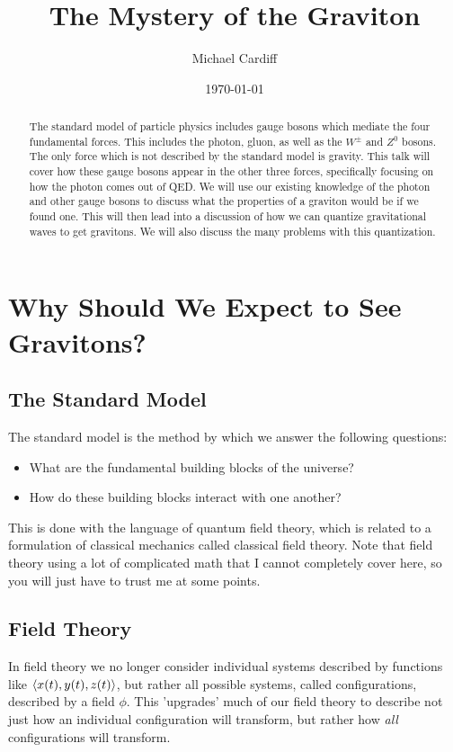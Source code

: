 \documentclass[12pt]{article}
\title{\vspace{-3em}The Mystery of the Graviton}
\author{Michael Cardiff}
\date{\today}
\begin{document}
\maketitle
\begin{abstract}
  The standard model of particle physics includes gauge bosons which mediate the four fundamental forces. This includes the photon, gluon, as well as the $W^{\pm}$ and $Z^0$ bosons. The only force which is not described by the standard model is gravity. This talk will cover how these gauge bosons appear in the other three forces, specifically focusing on how the photon comes out of QED. We will use our existing knowledge of the photon and other gauge bosons to discuss what the properties of a graviton would be if we found one. This will then lead into a discussion of how we can quantize gravitational waves to get gravitons. We will also discuss the many problems with this quantization.
\end{abstract}
\tableofcontents
\newpage
\section{Why Should We Expect to See Gravitons?}
\subsection{The Standard Model}
The standard model is the method by which we answer the following questions:
\begin{itemize}
\item What are the fundamental building blocks of the universe?
\item How do these building blocks interact with one another?
\end{itemize}
This is done with the language of quantum field theory, which is related to a formulation of classical mechanics called classical field theory. Note that field theory using a lot of complicated math that I cannot completely cover here, so you will just have to trust me at some points.

\subsection{Field Theory}
In field theory we no longer consider individual systems described by functions like $\ev{x(t),y(t),z(t)}$, but rather all possible systems, called configurations, described by a field $\phi$. This 'upgrades' much of our field theory to describe not just how an individual configuration will transform, but rather how \emph{all} configurations will transform.
\end{document}
